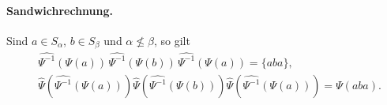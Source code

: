 \documentclass[main.tex]{subfiles}
\begin{document}
\paragraph{Sandwichrechnung.}
Sind \(a\in S_\alpha\), \(b\in S_\beta\) und
\(\alpha\nleq\beta\), so gilt
\begin{align}
&\widehat{\Psi^{-1}}(\Psi(a))\,
 \widehat{\Psi^{-1}}(\Psi(b))\,
 \widehat{\Psi^{-1}}(\Psi(a))=\{aba\},                  \tag{25.9}\\
&\widehat\Psi\!\left(\widehat{\Psi^{-1}}(\Psi(a))\right)
 \widehat\Psi\!\left(\widehat{\Psi^{-1}}(\Psi(b))\right)
 \widehat\Psi\!\left(\widehat{\Psi^{-1}}(\Psi(a))\right)
 =\Psi(aba).                                               \tag{25.10}
\end{align}

\begingroup
\let\proofstepwidestar\proofstepwidestarforcebreak
\let\proofstepwidestarbreak\proofstepwidestarforcebreak
\ProofWideReasonsNearFormula
\end{document}

